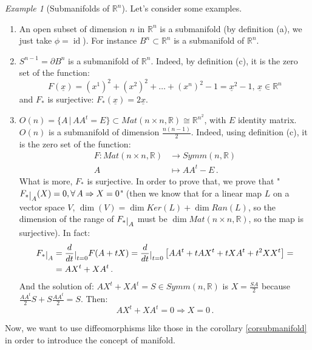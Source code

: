 \documentclass[a4paper,11pt,titlepage, article, oneside]{memoir}
\numberwithin{equation}{section}
\theoremstyle{definition}
\theoremstyle{remark}
\newtheorem{example}[theorem]{Example}
\DeclareMathOperator{\id}{id}
\newcommand{\rfield}{\mathbb{R}}
\newcommand{\restrict}[2]{{#1}\raisebox{-.5ex}{$|$}_{#2}}
\begin{document}
\begin{tcolorbox}\begin{example}[Submanifolds of $\rfield^n$]
  Let's consider some examples.
  \begin{enumerate}
    \item An open subset of dimension $n$ in $\rfield^n$ is a submanifold (by definition (a), we just take $\phi = \id$). For instance $B^n\subset \rfield^n$ is a submanifold of $\rfield^n$.
    \item $S^{n-1} = \partial B^n$ is a submanifold of $\rfield^n$. Indeed, by definition (c), it is the zero set of the function:
    $$F(\underline{x}) = (x^1)^2 + (x^2)^2 + \ldots + (x^n)^2 - 1 = \underline{x}^2 -1, \, \underline{x} \in \rfield^n$$
    and $F_*$ is surjective: $F_*(\underline{x}) = 2 \underline{x}$.
    \item $O(n) = \{A \, | \, AA^t = E\} \subset Mat(n \times n, \rfield) \cong \rfield^{n^2}$, with $E$ identity matrix. $O(n)$ is a submanifold of dimension $\frac{n(n-1)}{2}$. Indeed, using definition (c), it is the zero set of the function:
    \begin{align*}
      F \colon Mat(n \times n, \rfield) &\rightarrow Symm(n, \rfield) \\
      A &\mapsto AA^t - E \, .
    \end{align*}
    What is more, $F_*$ is surjective. In order to prove that, we prove that "$\restrict{F_*}{A}(X)=0, \forall\, A \Rightarrow X = 0$" (then we know that for a linear map $L$ on a vector space $V$, $\dim(V) = \dim Ker(L) + \dim Ran(L)$, so the dimension of the range of $\restrict{F_*}{A}$ must be $\dim Mat(n\times n, \rfield)$, so the map is surjective).
    In fact:
    \begin{align*}
    \restrict{F_*}{A} &= \restrict{\frac{d}{dt}}{t=0}F(A + tX) = \restrict{\frac{d}{dt}}{t=0} \left[ AA^t + tAX^t + tXA^t + t^2XX^t \right] = \\
    & = AX^t + XA^t \, .
  \end{align*}
    And the solution of:
    $AX^t + XA^t = S \in Symm(n, \rfield)$
    is $X = \frac{SA}{2}$ because $\frac{AA^t}{2}S + S\frac{AA^t}{2} = S$.
    Then:
    $$AX^t + XA^t = 0 \Longrightarrow X=0 \, .$$
  \end{enumerate}
\end{example}\end{tcolorbox}

Now, we want to use diffeomorphisms like those in the corollary \ref{corsubmanifold} in order to introduce the concept of manifold.
\end{document}
